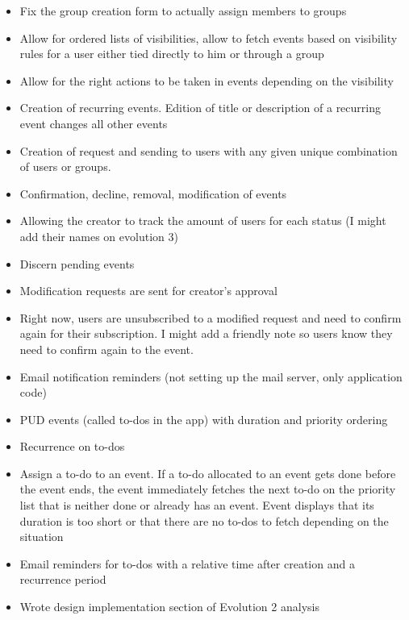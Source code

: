 \documentclass[11pt]{article}
\begin{document}
\begin{itemize}

\item Fix the group creation form to actually assign members to groups
\item Allow for ordered lists of visibilities, allow to fetch events based on visibility rules for a user either tied directly to him or through a group
\item Allow for the right actions to be taken in events depending on the visibility
\item Creation of recurring events. Edition of title or description of a recurring event changes all other events
\item Creation of request and sending to users with any given unique combination of users or groups.
\item Confirmation, decline, removal, modification of events
\item Allowing the creator to track the amount of users for each status (I might add their names on evolution 3)
\item Discern pending events
\item Modification requests are sent for creator’s approval
\item Right now, users are unsubscribed to a modified request and need to confirm again for their subscription. I might add a friendly note so users know they need to confirm again to the event.
\item Email notification reminders (not setting up the mail server, only application code)
\item PUD events (called to-dos in the app) with duration and priority ordering
\item Recurrence on to-dos
\item Assign a to-do to an event. If a to-do allocated to an event gets done before the event ends, the event immediately fetches the next to-do on the priority list that is neither done or already has an event. Event displays that its duration is too short or that there are no to-dos to fetch depending on the situation
\item Email reminders for to-dos with a relative time after creation and a recurrence period
\item Wrote design implementation section of Evolution 2 analysis

\end{itemize}
\end{document}
